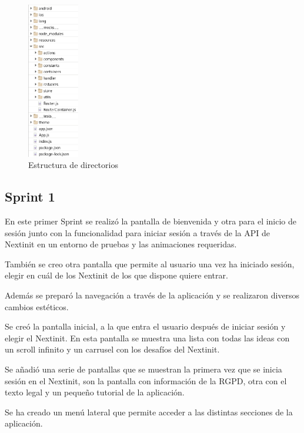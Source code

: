 \begin{figure}[!h]
	\begin{center}
		\includegraphics[width=0.2\textwidth]{./img/resultados/estructura.png}
		\caption{Estructura de directorios}
		\label{fig:estructura}
	\end{center}
\end{figure}

\subsection{Sprint 1}

En este primer Sprint se realizó la pantalla de bienvenida y otra para el inicio de sesión junto 
con la funcionalidad para iniciar sesión a través de la API de Nextinit en un entorno de 
pruebas y las animaciones requeridas.

También se creo otra pantalla que permite al usuario una vez ha iniciado sesión,
elegir en cuál de los Nextinit de los que dispone quiere entrar.

Además se preparó la navegación a través de la aplicación y se realizaron diversos 
cambios estéticos.

Se creó la pantalla inicial, a la que entra el usuario después de iniciar sesión y elegir el 
Nextinit. En esta pantalla se muestra una lista con todas las ideas con un scroll infinito
y un carrusel con los desafíos del Nextinit.

Se añadió una serie de pantallas que se muestran la primera vez que se inicia sesión 
en el Nextinit, son la pantalla con información de la RGPD, otra con el texto legal y 
un pequeño tutorial de la aplicación.

Se ha creado un menú lateral que permite acceder a las distintas secciones de la 
aplicación.

